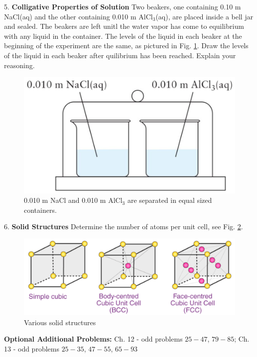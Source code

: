 \documentclass[11pt]{article}
\begin{document}
\pagebreak

5. \textbf{Colligative Properties of Solution} Two beakers, one containing 0.10 m NaCl(aq)
and the other containing 0.010 m AlCl$_3$(aq), are placed inside a bell jar and sealed.
The beakers are left unitl the water vapor has come to equilibrium with any liquid in the
container. The levels of the liquid in each beaker at the beginning of the experiment
are the same, as pictured in Fig. \ref{fig:beakers}. Draw the levels of the liquid in
each beaker after quilibrium has been reached. Explain your reasoning.

\begin{figure}[hbpt]
  \centering
  \includegraphics[scale=0.3]{nacl_alcl3.png}
  \caption{0.010 m NaCl and 0.010 m AlCl$_3$ are separated in equal sized
    containers.}
  \label{fig:beakers}
\end{figure}

6. \textbf{Solid Structures} Determine the number of atoms per unit cell,
see Fig. \ref{fig:cub}.

\begin{figure}[hbpt]
  \centering
  \includegraphics[scale=0.3]{cubic.png}
  \caption{Various solid structures}
  \label{fig:cub}
\end{figure}

\vfill
\textbf{Optional Additional Problems:} Ch. 12 - odd problems $25 - 47$, $79 - 85$;
Ch. 13 - odd problems $25 - 35$, $47 - 55$, $65 - 93$
\end{document}
